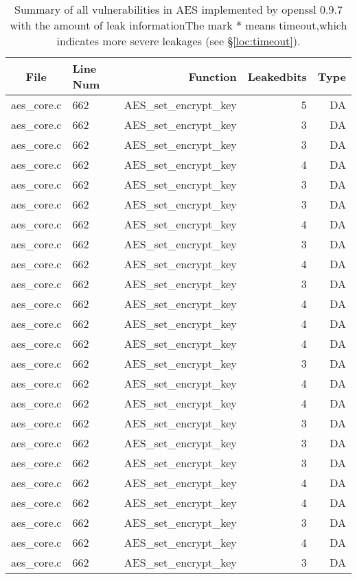 \begin{table}%
\centering
\caption{Summary of all vulnerabilities in AES implemented by openssl 0.9.7 with the amount of leak informationThe mark $*$ means timeout,which indicates more severe leakages (see \S\ref{loc:timeout}).}\label{tab:AESopenssl}
\begin{tabular}{clrrr}
\hline
\textbf{File} & \textbf{Line Num} & \textbf{Function} & \textbf{Leakedbits} & \textbf{Type} \\\hline
aes\_core.c& 662&AES\_set\_encrypt\_key&5 &DA\\
aes\_core.c& 662&AES\_set\_encrypt\_key&3 &DA\\
aes\_core.c& 662&AES\_set\_encrypt\_key&3 &DA\\
aes\_core.c& 662&AES\_set\_encrypt\_key&4 &DA\\
aes\_core.c& 662&AES\_set\_encrypt\_key&3 &DA\\
aes\_core.c& 662&AES\_set\_encrypt\_key&3 &DA\\
aes\_core.c& 662&AES\_set\_encrypt\_key&4 &DA\\
aes\_core.c& 662&AES\_set\_encrypt\_key&3 &DA\\
aes\_core.c& 662&AES\_set\_encrypt\_key&4 &DA\\
aes\_core.c& 662&AES\_set\_encrypt\_key&3 &DA\\
aes\_core.c& 662&AES\_set\_encrypt\_key&4 &DA\\
aes\_core.c& 662&AES\_set\_encrypt\_key&4 &DA\\
aes\_core.c& 662&AES\_set\_encrypt\_key&4 &DA\\
aes\_core.c& 662&AES\_set\_encrypt\_key&3 &DA\\
aes\_core.c& 662&AES\_set\_encrypt\_key&4 &DA\\
aes\_core.c& 662&AES\_set\_encrypt\_key&4 &DA\\
aes\_core.c& 662&AES\_set\_encrypt\_key&3 &DA\\
aes\_core.c& 662&AES\_set\_encrypt\_key&3 &DA\\
aes\_core.c& 662&AES\_set\_encrypt\_key&3 &DA\\
aes\_core.c& 662&AES\_set\_encrypt\_key&4 &DA\\
aes\_core.c& 662&AES\_set\_encrypt\_key&4 &DA\\
aes\_core.c& 662&AES\_set\_encrypt\_key&3 &DA\\
aes\_core.c& 662&AES\_set\_encrypt\_key&4 &DA\\
aes\_core.c& 662&AES\_set\_encrypt\_key&3 &DA\\

\end{tabular}
\end{table}
